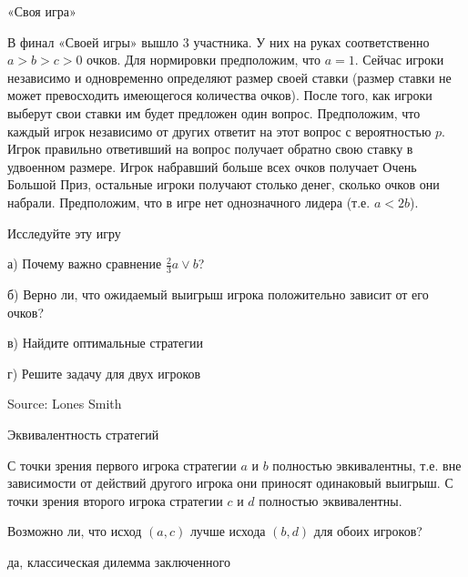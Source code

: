 \begin{problem}
 «Своя игра» \par
В финал «Своей игры» вышло 3 участника. У них на руках соответственно $a>b>c>0$ очков. Для нормировки предположим, что $a=1$. Сейчас игроки независимо и одновременно определяют размер своей ставки (размер ставки не может превосходить имеющегося количества очков). После того, как игроки выберут свои ставки им будет предложен один вопрос. Предположим, что каждый игрок независимо от других ответит на этот вопрос с вероятностью $p$. Игрок правильно ответивший на вопрос получает обратно свою ставку в удвоенном размере. Игрок набравший больше всех очков получает Очень Большой Приз, остальные игроки получают столько денег, сколько очков они набрали. Предположим, что в игре нет однозначного лидера (т.е. $a<2b$). \par
Исследуйте эту игру \par
а) Почему важно сравнение $\frac{2}{3}a \vee b$? \par
б) Верно ли, что ожидаемый выигрыш игрока положительно зависит от его очков? \par
в) Найдите оптимальные стратегии \par
г) Решите задачу для двух игроков \par
Source: Lones Smith



\begin{sol}

\end{sol}
\end{problem}



\begin{problem}
 Эквивалентность стратегий \par
С точки зрения первого игрока стратегии $a$ и $b$ полностью
эвкивалентны, т.е. вне зависимости от действий другого игрока они
приносят одинаковый выигрыш. С точки зрения второго игрока
стратегии $c$ и $d$ полностью эквивалентны. \par
Возможно ли, что исход $(a,c)$ лучше исхода $(b,d)$ для обоих
игроков?



\begin{sol}
да, классическая дилемма заключенного
\end{sol}
\end{problem}



